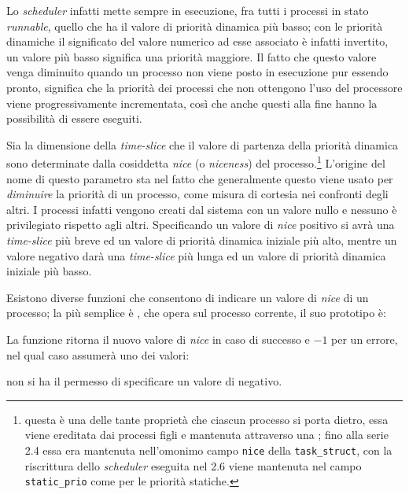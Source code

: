 Lo \textit{scheduler} infatti mette sempre in esecuzione, fra tutti i processi
in stato \textit{runnable}, quello che ha il valore di priorità dinamica più
basso; con le priorità dinamiche il significato del valore numerico ad esse
associato è infatti invertito, un valore più basso significa una priorità
maggiore. Il fatto che questo valore venga diminuito quando un processo non
viene posto in esecuzione pur essendo pronto, significa che la priorità dei
processi che non ottengono l'uso del processore viene progressivamente
incrementata, così che anche questi alla fine hanno la possibilità di essere
eseguiti.

Sia la dimensione della \textit{time-slice} che il valore di partenza della
priorità dinamica sono determinate dalla cosiddetta \textit{nice} (o
\textit{niceness}) del processo.\footnote{questa è una delle tante proprietà
  che ciascun processo si porta dietro, essa viene ereditata dai processi
  figli e mantenuta attraverso una ; fino alla serie 2.4 essa era
  mantenuta nell'omonimo campo \texttt{nice} della \texttt{task\_struct}, con
  la riscrittura dello \textit{scheduler} eseguita nel 2.6 viene mantenuta nel
  campo \texttt{static\_prio} come per le priorità statiche.} L'origine del
nome di questo parametro sta nel fatto che generalmente questo viene usato per
\textsl{diminuire} la priorità di un processo, come misura di cortesia nei
confronti degli altri.  I processi infatti vengono creati dal sistema con un
valore nullo e nessuno è privilegiato rispetto agli altri. Specificando un
valore di \textit{nice} positivo si avrà una \textit{time-slice} più breve ed
un valore di priorità dinamica iniziale più alto, mentre un valore negativo
darà una \textit{time-slice} più lunga ed un valore di priorità dinamica
iniziale più basso.

Esistono diverse funzioni che consentono di indicare un valore di
\textit{nice} di un processo; la più semplice è , che opera sul
processo corrente, il suo prototipo è:

\begin{funcproto}{ 
}
{La funzione ritorna il nuovo valore di \textit{nice} in caso di successo e
  $-1$ per un errore, nel qual caso  assumerà uno dei valori:
\begin{errlist}
  \item[\errcode{EPERM}] non si ha il permesso di specificare un valore
    di  negativo. 
\end{errlist}}
\end{funcproto}


